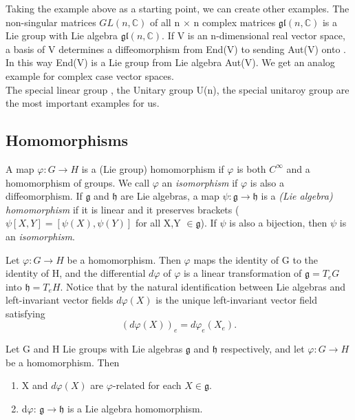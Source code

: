 Taking the example above as a starting point, we can create other examples. The non-singular matrices $GL(n,\mathbb{C})$ of all 
n $\times$ n complex matrices $\mathfrak{gl}(n,\mathbb{C})$ is a Lie group with Lie algebra $\mathfrak{gl}(n,\mathbb{C})$.
If V is an n-dimensional real vector space, a basis of V determines a diffeomorphism from End(V) to \gl sending Aut(V) onto 
\Gl. In this way End(V) is a Lie group from Lie algebra Aut(V). We get an analog example for complex case vector spaces.
 \\ The special linear group \Sl, the Unitary group U(n), the special unitaroy group \Su are the most important examples
 for us. 
 \subsection{Homomorphisms}
 \begin{definition}
  A map $\varphi:G \rightarrow H$ is a (Lie group) homomorphism if $\varphi$ is both $C^{\infty}$ and a homomorphism of groups.
  We call $\varphi$ an \textit{isomorphism} if $\varphi$ is also a diffeomorphism. 
  If $\mathfrak{g}$ and $\mathfrak{h}$ are Lie algebras, a map $\psi:\mathfrak{g} \rightarrow \mathfrak{h}$ is a 
  \textit{(Lie algebra) homomorphism} if it is linear and it preserves brackets ($\psi[X,Y]=[\psi(X),\psi(Y)]$ for all 
  X,Y $\in \mathfrak{g}$). If $\psi$ is also a bijection, then $\psi$ is an \textit{isomorphism}.
 \end{definition}
Let $\varphi:G \rightarrow H$ be a homomorphism. Then $\varphi$ maps the identity of G to the identity of H, and the differential
$d \varphi$ of $\varphi$ is a linear transformation of $\mathfrak{g}=T_{e}G$ into $\mathfrak{h} = T_e H$. Notice that by the natural
identification between Lie algebras and left-invariant vector fields $d\varphi(X)$ is the unique left-invariant vector field
satisfying 
\begin{equation}\label{2.3.1}
 (d\varphi(X))_e = d\varphi_e(X_e).
\end{equation}
\begin{theorem}\label{2.3.2}
 Let G and H Lie groups with Lie algebras $\mathfrak{g}$ and $\mathfrak{h}$ respectively, and let $\varphi:G \rightarrow H$
 be a homomorphism. Then
 \begin{enumerate}
  \item X and $d\varphi(X)$ are $\varphi$-related for each $X \in \mathfrak{g}$.
  \item d$\varphi$: $\mathfrak{g}\rightarrow \mathfrak{h}$ is a Lie algebra homomorphism. 
 \end{enumerate}

\end{theorem}
